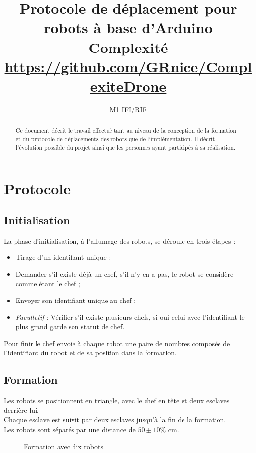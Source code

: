 \documentclass[a4paper,12pt]{article}
\title{%
        Protocole de déplacement pour robots à base d'Arduino\\
        \large Complexité\\
        \href{https://github.com/GRnice/ComplexiteDrone}{https://github.com/GRnice/ComplexiteDrone}
}
\author{%
        M1 IFI/RIF
}
\begin{document}
\maketitle

\begin{abstract}
        Ce document décrit le travail effectué tant au niveau de la conception de la formation et du protocole de déplacements des robots que de l'implémentation. Il décrit l'évolution possible du projet ainsi que les personnes ayant participés à sa réalisation.
\end{abstract}

\newpage

\section{Protocole}\label{protocole}
\subsection{Initialisation}
La phase d'initialisation, à l'allumage des robots, se déroule en trois étapes :
\begin{itemize}
        \item Tirage d'un identifiant unique ;
        \item Demander s'il existe déjà un chef, s'il n'y en a pas, le robot se considère comme étant le chef ;
        \item Envoyer son identifiant unique au chef ;
        \item \textit{Facultatif} : Vérifier s'il existe plusieurs chefs, si oui celui avec l'identifiant le plus grand garde son statut de chef.
\end{itemize}
Pour finir le chef envoie à chaque robot une paire de nombres composée de l'identifiant du robot et de sa position dans la formation.
\subsection{Formation}
Les robots se positionnent en triangle, avec le chef en tête et deux esclaves derrière lui.\\
Chaque esclave est suivit par deux esclaves jusqu'à la fin de la formation.\\
Les robots sont séparés par une distance de $50 \pm 10\%$ cm.
\begin{figure}[!h]
        \centering
        \caption{Formation avec dix robots}\label{fig:Form}
\end{figure}
\end{document}
